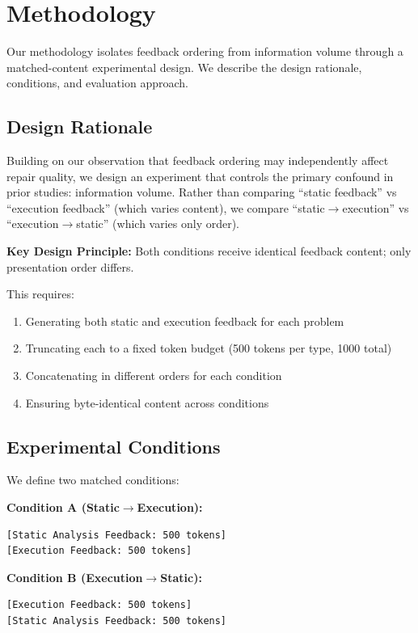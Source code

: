 \section{Methodology}
\label{sec:methodology}

Our methodology isolates feedback ordering from information volume through a matched-content experimental design. We describe the design rationale, conditions, and evaluation approach.

\subsection{Design Rationale}

Building on our observation that feedback ordering may independently affect repair quality, we design an experiment that controls the primary confound in prior studies: information volume. Rather than comparing ``static feedback'' vs ``execution feedback'' (which varies content), we compare ``static$\rightarrow$execution'' vs ``execution$\rightarrow$static'' (which varies only order).

\textbf{Key Design Principle:} Both conditions receive identical feedback content; only presentation order differs.

This requires:
\begin{enumerate}
    \item Generating both static and execution feedback for each problem
    \item Truncating each to a fixed token budget (500 tokens per type, 1000 total)
    \item Concatenating in different orders for each condition
    \item Ensuring byte-identical content across conditions
\end{enumerate}

\subsection{Experimental Conditions}

We define two matched conditions:

\textbf{Condition A (Static$\rightarrow$Execution):}
\begin{verbatim}
[Static Analysis Feedback: 500 tokens]
[Execution Feedback: 500 tokens]
\end{verbatim}

\textbf{Condition B (Execution$\rightarrow$Static):}
\begin{verbatim}
[Execution Feedback: 500 tokens]
[Static Analysis Feedback: 500 tokens]
\end{verbatim}

